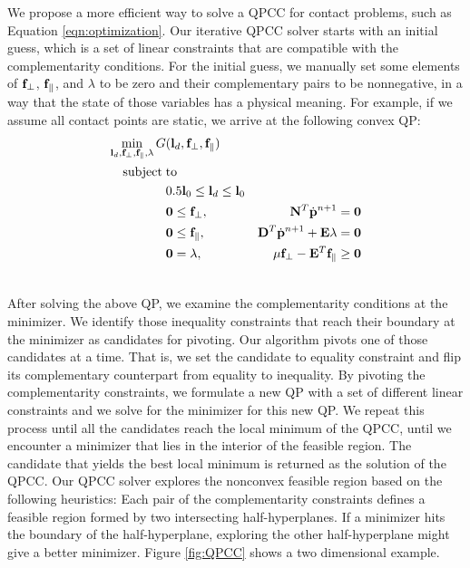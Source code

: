 We propose a more efficient way to solve a QPCC for contact problems, such as Equation \ref{eqn:optimization}. Our iterative QPCC solver starts with an initial guess, which is a set of linear constraints that are compatible with the complementarity conditions. For the initial guess, we manually set some elements of $\mathbf{f}_\perp$, $\mathbf{f}_\parallel$, and $\lambda$ to be zero and their complementary pairs to be nonnegative, in a way that the state of those variables has a physical meaning. For example, if we assume all contact points are static, we arrive at the following convex QP:
\begin{align}
\min_{\mathbf{l}_d,\mathbf{f}_\perp,\mathbf{f}_\parallel,\lambda} G&(\mathbf{l}_d,\mathbf{f}_\perp,\mathbf{f}_\parallel) & \label{eqn:initialGuess} \\
\mathrm{subject\;} &\mathrm{to} & \nonumber\\
 & 0.5\mathbf{l}_0 \leq \mathbf{l}_d \leq \mathbf{l}_0 & \nonumber \\
 & \mathbf{0} \leq \mathbf{f}_\perp, & \mathbf{N}^T\dot{\mathbf{p}}^{n+1} = \mathbf{0} \label{eqn:initialGuess1}\\
 & \mathbf{0} \leq \mathbf{f}_\parallel, &  \mathbf{D}^T \dot{\mathbf{p}}^{n+1} + \mathbf{E} \lambda = \mathbf{0} \label{eqn:initialGuess2}\\
 & \mathbf{0} = \lambda, & \mu \mathbf{f}_\perp - \mathbf{E}^T \mathbf{f}_\parallel \geq \mathbf{0} \label{eqn:initialGuess3} \\
 \nonumber
\end{align}


After solving the above QP, we examine the complementarity conditions
at the minimizer. We identify those inequality constraints that reach
their boundary at the minimizer as candidates for pivoting. Our
algorithm pivots one of those candidates at a time. That is, we set
the candidate to equality constraint and flip its complementary
counterpart from equality to inequality. By pivoting the
complementarity constraints, we formulate a new QP with a set of different
linear constraints and we solve for the minimizer for this new
QP. We repeat this process until all the candidates reach the local
minimum of the QPCC, \ie until we encounter a minimizer that lies in the
interior of the feasible region. The candidate that yields the best
local minimum is returned as the solution of the QPCC. Our QPCC solver
explores the nonconvex feasible region based on the following
heuristics: Each pair of the complementarity constraints defines a
feasible region formed by two intersecting half-hyperplanes. If a minimizer hits the boundary of the half-hyperplane, exploring the other
half-hyperplane might give a better minimizer. Figure \ref{fig:QPCC}
shows a two dimensional example.

